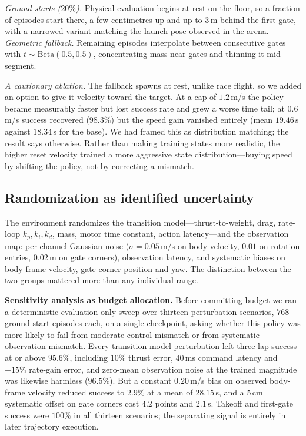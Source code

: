 \documentclass[10pt, twocolumn]{article}
\begin{document}
\emph{Ground starts ($20\%$).} Physical evaluation begins at rest on the floor,
so a fraction of episodes start there, a few centimetres up and up to $3$\,m
behind the first gate, with a narrowed variant matching the launch pose
observed in the arena. \emph{Geometric fallback.} Remaining episodes
interpolate between consecutive gates with $t \sim \mathrm{Beta}(0.5,0.5)$,
concentrating mass near gates and thinning it mid-segment.

\emph{A cautionary ablation.} The fallback spawns at rest, unlike race flight,
so we added an option to give it velocity toward the target. At a cap of
$1.2$\,m/s the policy became measurably faster but lost success rate and grew a
worse time tail; at $0.6$\,m/s success recovered ($98.3\%$) but the speed gain
vanished entirely (mean $19.46$\,s against $18.34$\,s for the base). We had
framed this as distribution matching; the result says otherwise. Rather than
making training states more realistic, the higher reset velocity trained a more
aggressive state distribution---buying speed by shifting the policy, not by
correcting a mismatch.

\subsection{Randomization as identified uncertainty}
\label{sec:dr}

The environment randomizes the transition model---thrust-to-weight, drag,
rate-loop $k_p,k_i,k_d$, mass, motor time constant, action latency---and the
observation map: per-channel Gaussian noise ($\sigma = 0.05$\,m/s on body
velocity, $0.01$ on rotation entries, $0.02$\,m on gate corners), observation
latency, and systematic biases on body-frame velocity, gate-corner position and
yaw. The distinction between the two groups mattered more than any individual
range.

\textbf{Sensitivity analysis as budget allocation.} Before committing budget we
ran a deterministic evaluation-only sweep over thirteen perturbation scenarios,
$768$ ground-start episodes each, on a single checkpoint, asking whether this
policy was more likely to fail from moderate control mismatch or from
systematic observation mismatch. Every transition-model perturbation left
three-lap success at or above $95.6\%$, including $10\%$ thrust error, $40$\,ms
command latency and $\pm15\%$ rate-gain error, and zero-mean observation noise
at the trained magnitude was likewise harmless ($96.5\%$). But a constant
$0.20$\,m/s bias on observed body-frame velocity reduced success to $2.9\%$ at
a mean of $28.15$\,s, and a $5$\,cm systematic offset on gate corners cost
$4.2$ points and $2.1$\,s. Takeoff and first-gate success were $100\%$ in all
thirteen scenarios; the separating signal is entirely in later trajectory
execution.
\end{document}
